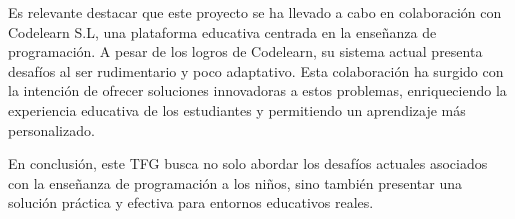 Es relevante destacar que este proyecto se ha llevado a cabo en colaboración con Codelearn S.L, una plataforma educativa centrada en la enseñanza de programación. A pesar de los logros de Codelearn, su sistema actual presenta desafíos al ser rudimentario y poco adaptativo. Esta colaboración ha surgido con la intención de ofrecer soluciones innovadoras a estos problemas, enriqueciendo la experiencia educativa de los estudiantes y permitiendo un aprendizaje más personalizado.

En conclusión, este TFG busca no solo abordar los desafíos actuales asociados con la enseñanza de programación a los niños, sino también presentar una solución práctica y efectiva para entornos educativos reales.

